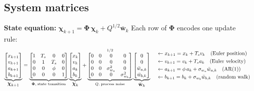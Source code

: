 \documentclass[12pt, a4paper]{article}
\begin{document}
\subsection*{System matrices}
\textbf{State equation:}
$\boldsymbol{\chi}_{k+1} = \boldsymbol{\Phi}\,\boldsymbol{\chi}_k + Q^{1/2}\bar{\mathbf{w}}_k$
Each row of $\boldsymbol{\Phi}$ encodes one update rule:
\[
\underbrace{
\begin{bmatrix} x_{k+1} \\ v_{k+1} \\ a_{k+1} \\ b_{k+1} \end{bmatrix}
}_{\displaystyle\boldsymbol{\chi}_{k+1}}
=
\underbrace{
\begin{bmatrix}
  1 & T_s & 0    & 0 \\
  0 & 1   & T_s  & 0 \\
  0 & 0   & \phi & 0 \\
  0 & 0   & 0    & 1
\end{bmatrix}
}_{\boldsymbol{\Phi},\;{\scriptsize\text{state transition}}}
\underbrace{
\begin{bmatrix} x_k \\ v_k \\ a_k \\ b_k \end{bmatrix}
}_{\displaystyle\boldsymbol{\chi}_k}
+
\underbrace{
\begin{bmatrix}
  0 & 0 & 0              & 0              \\
  0 & 0 & 0              & 0              \\
  0 & 0 & \sigma_{w_a}^2 & 0              \\
  0 & 0 & 0              & \sigma_{w_b}^2
\end{bmatrix}
}_{Q,\;{\scriptsize\text{process noise}}}^{1/2}
\underbrace{
\begin{bmatrix} 0 \\ 0 \\ \bar{w}_{a,k} \\ \bar{w}_{b,k} \end{bmatrix}
}_{\displaystyle\bar{\mathbf{w}}_k}
\quad
\begin{aligned}
  &\leftarrow x_{k+1} = x_k + T_s v_k \quad \text{(Euler position)}\\
  &\leftarrow v_{k+1} = v_k + T_s a_k \quad \text{(Euler velocity)}\\
  &\leftarrow a_{k+1} = \phi\,a_k + \sigma_{w_a}\bar{w}_{a,k} \quad \text{(AR(1))}\\
  &\leftarrow b_{k+1} = b_k + \sigma_{w_b}\bar{w}_{b,k} \quad \text{(random walk)}
\end{aligned}
\]
\end{document}
